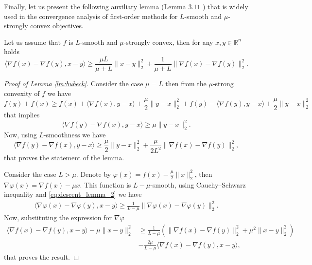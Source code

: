 {Finally, let us present the following auxiliary lemma (Lemma $3.11$ \cite{bubeck2015convex}) that is widely used in the convergence analysis of first-order methods for $L$-smooth and $\mu$-strongly convex objectives.

\begin{lemma}\label{lm:bubeck}
Let us assume that $f$ is $L$-smooth and $\mu$-strongly convex, then for any $x,y\in\mathbb{R}^n$ holds
\begin{equation}\label{eq:bubeck}
\langle \nabla f(x)- \nabla f(y), x - y\rangle\geq \frac{\mu L}{\mu + L}\|x-y\|_2^2 + \frac{1}{\mu + L}\|\nabla f(x) - \nabla f(y)\|_2^2.
\end{equation}
\end{lemma}
\begin{proof}[Proof of Lemma \ref{lm:bubeck}]
Consider the case $\mu = L$ then from the $\mu$-strong convexity of $f$ we have
$$
f(y) + f(x) \geq f(x) + \langle \nabla f(x), y-x\rangle + \frac{\mu}{2}\|y-x\|_2^2 + f(y) - \langle \nabla f(y), y-x\rangle + \frac{\mu}{2}\|y-x\|_2^2
$$
that implies 
\begin{equation}
    \langle \nabla f(y) - \nabla f(x), y-x\rangle\geq \mu\|y-x\|_2^2.
\end{equation}
Now, using $L$-smoothness we have
\begin{equation}
    \langle \nabla f(y) - \nabla f(x), y-x\rangle\geq \frac{\mu}{2}\|y-x\|_2^2 + \frac{\mu}{2L^2}\|\nabla f(x) - \nabla f(y)\|_2^2,
\end{equation}
that proves the statement of the lemma.

Consider the case $L>\mu$. Denote by $\varphi(x)=f(x) -\frac{\mu}{2}\|x\|_2^2$, then $\nabla \varphi(x) = \nabla f(x) - \mu x$. This function is $L-\mu$-smooth, using Cauchy–Schwarz inequality and \eqref{eq:descent_lemma_2} we have
\begin{align}
\langle \nabla\varphi(x) -\nabla\varphi(y), x-y\rangle\geq \frac{1}{L-\mu}\|\nabla \varphi(x) - \nabla \varphi(y)\|_2^2.
\end{align}
Now, substituting the expression for $\nabla \varphi$ 
\begin{align}
\langle \nabla f(x)- \nabla f(y), x - y\rangle - \mu\|x-y\|_2^2 &\geq \frac{1}{L-\mu}\left(\|\nabla f(x) - \nabla f(y)\|_2^2 + \mu^2\|x-y\|_2^2\right)\nonumber\\
&- \frac{2\mu}{L-\mu} \langle \nabla f(x)- \nabla f(y), x - y\rangle,
\end{align}
that proves the result.
\end{proof}
}